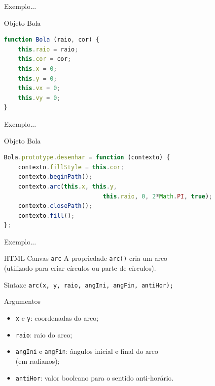 \documentclass[xcolor=dvipsnames,table]{beamer}
\begin{document}
\begin{frame}[fragile]{Exemplo...}
	\begin{block}{Objeto Bola}
		\begin{lstlisting}[language=JavaScript]
function Bola (raio, cor) {
	this.raio = raio;
	this.cor = cor;
	this.x = 0;
	this.y = 0;
	this.vx = 0;
	this.vy = 0;
}
\end{lstlisting}	
	\end{block}
\end{frame}

\begin{frame}[fragile]{Exemplo...}
	\begin{block}{Objeto Bola}
		\begin{lstlisting}[language=JavaScript]
Bola.prototype.desenhar = function (contexto) {
	contexto.fillStyle = this.cor;
	contexto.beginPath();
	contexto.arc(this.x, this.y, 
							this.raio, 0, 2*Math.PI, true);
	contexto.closePath();
	contexto.fill();
};
\end{lstlisting}	
	\end{block}
\end{frame}

\begin{frame}[fragile]{Exemplo...} 
	\begin{block}{HTML Canvas {\tt arc}}
		A propriedade {\tt arc()} cria um arco \\(utilizado para criar círculos ou parte de círculos). 
	\end{block}
	\begin{block}{Sintaxe}
		{\tt arc(x, y, raio, angIni, angFin, antiHor);}
	\end{block}
	\begin{block}{Argumentos}
		\begin{itemize}
			\item {\tt x} e {\tt y}: coordenadas do arco;
			\item {\tt raio}: raio do arco; 
			\item {\tt angIni} e {\tt angFin}: ângulos inicial e final do arco \\(em radianos);
			\item {\tt antiHor}: valor booleano para o sentido anti-horário.
		\end{itemize}
	\end{block}
\end{frame}
\end{document}
